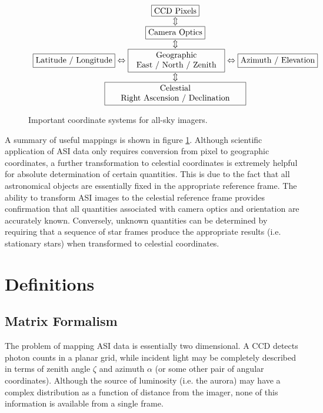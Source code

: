 \documentclass[11pt,twoside]{article}   %
\begin{document}
 \begin{figure}[htb!]
 \begin{displaymath}
 \begin{array}{c}
  \fbox{CCD Pixels} \\
  {\Updownarrow} \\
  \fbox{Camera Optics} \\
  {\Updownarrow} \\
  \fbox{Latitude / Longitude} \Leftrightarrow \fbox{\parbox{3.9cm}{\centering Geographic \\ East / North / Zenith}} \Leftrightarrow \fbox{Azimuth / Elevation} \\
  {\Updownarrow}\\
   \fbox{\parbox{5.8cm}{\centering Celestial \\ Right Ascension / Declination}}
 \end{array}
 \end{displaymath}
  \caption{Important coordinate systems for all-sky imagers.
  \label{fig:flowchart}}
 \end{figure}

\noindent A summary of useful mappings is shown in figure
\ref{fig:flowchart}.  Although scientific application of ASI data
only requires conversion from pixel to geographic coordinates, a
further transformation to celestial coordinates is extremely
helpful for absolute determination of certain quantities. This is
due to the fact that all astronomical objects are essentially
fixed in the appropriate reference frame.  The ability to
transform ASI images to the celestial reference frame provides
confirmation that all quantities associated with camera optics and
orientation are accurately known. Conversely, unknown quantities
can be determined by requiring that a sequence of star frames
produce the appropriate results (i.e. stationary stars) when
transformed to celestial coordinates.

%

 \newpage
 \section{Definitions}

\subsection{Matrix Formalism} \label{sec:matrix_formalism}

The problem of mapping ASI data is essentially two dimensional. A
CCD detects photon counts in a planar grid, while incident light
may be completely described in terms of zenith angle $\zeta$ and
azimuth $\alpha$ (or some other pair of angular coordinates).
Although the source of luminosity (i.e. the aurora) may have a
complex distribution as a function of distance from the imager,
none of this information is available from a single frame.
\end{document}
